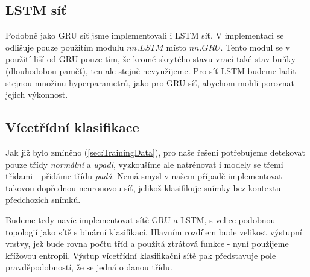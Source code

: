 \subsection{LSTM síť}

Podobně jako GRU síť jsme implementovali i LSTM síť. V implementaci se odlišuje
pouze použitím modulu $nn.LSTM$ místo $nn.GRU$. Tento modul se v použití liší
od GRU pouze tím, že kromě skrytého stavu vrací také stav buňky (dlouhodobou
paměť), ten ale stejně nevyužijeme. Pro síť LSTM budeme ladit stejnou množinu
hyperparametrů, jako pro GRU síť, abychom mohli porovnat jejich výkonnost.

\subsection{Vícetřídní klasifikace}

Jak již bylo zmíněno (\ref{sec:TrainingData}), pro naše řešení potřebujeme detekovat pouze třídy \textit{normální} a \textit{upadl}, vyzkoušíme ale natrénovat i modely se třemi třídami - přidáme třídu \textit{padá}. Nemá smysl v našem případě implementovat takovou dopřednou neuronovou síť, jelikož klasifikuje snímky bez kontextu předchozích snímků. 

Budeme tedy navíc implementovat sítě GRU a LSTM, s velice podobnou topologií jako sítě s binární klasifikací. Hlavním rozdílem bude velikost 
výstupní vrstvy, jež bude rovna počtu tříd a použitá ztrátová funkce - nyní použijeme křížovou entropii. Výstup vícetřídní klasifikační sítě pak představuje pole pravděpodobností, že se jedná o danou třídu.

\endinput
